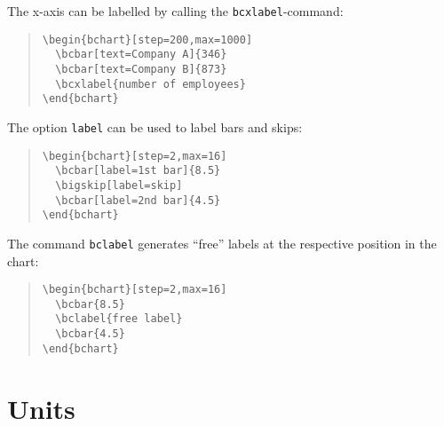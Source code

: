 \documentclass{article}
\begin{document}
The x-axis can be labelled by calling the \texttt{bcxlabel}-command:
\begin{quote}\small
\begin{verbatim}
\begin{bchart}[step=200,max=1000]
  \bcbar[text=Company A]{346}
  \bcbar[text=Company B]{873}
  \bcxlabel{number of employees}
\end{bchart}
\end{verbatim}
\end{quote}
\begin{quote}
\begin{bchart}[step=200,max=1000]
\end{bchart}
\end{quote}
The option \texttt{label} can be used to label bars and skips:
\begin{quote}\small
\begin{verbatim}
\begin{bchart}[step=2,max=16]
  \bcbar[label=1st bar]{8.5}
  \bigskip[label=skip]
  \bcbar[label=2nd bar]{4.5}
\end{bchart}
\end{verbatim}
\end{quote}
\begin{quote}
\begin{bchart}[step=2,max=16]
  \bigskip[label=skip]
\end{bchart}
\end{quote}
The command \texttt{bclabel} generates ``free'' labels at the respective position in the chart:
\begin{quote}\small
\begin{verbatim}
\begin{bchart}[step=2,max=16]
  \bcbar{8.5}
  \bclabel{free label}
  \bcbar{4.5}
\end{bchart}
\end{verbatim}
\end{quote}
\begin{quote}
\begin{bchart}[step=2,max=16]
\end{bchart}
\end{quote}


\section{Units}
\end{document}
